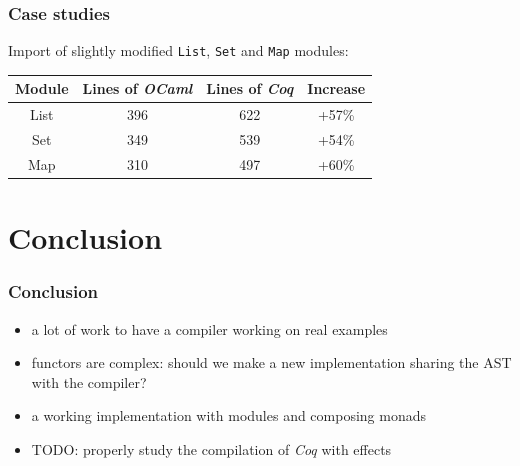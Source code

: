 \documentclass[hyperref={pdfpagelabels=false}]{beamer}
\begin{document}
  \begin{frame}
    \frametitle{Case studies}
    Import of slightly modified \texttt{List}, \texttt{Set} and \texttt{Map} modules:
    \begin{center}
      \begin{tabular}{c|cc|c}
        Module & Lines of \emph{OCaml} & Lines of \emph{Coq} & Increase\\
        \hline
        List & 396 & 622 & +57\%\\
        Set & 349 & 539 & +54\%\\
        Map & 310 & 497 & +60\%\\
      \end{tabular}
    \end{center}
  \end{frame}

  \section{Conclusion}
  \begin{frame}
    \frametitle{Conclusion}
    \begin{itemize}
      \item a lot of work to have a compiler working on real examples
      \item functors are complex: should we make a new implementation sharing the AST with the compiler?
      \item a working implementation with modules and composing monads
      \item TODO: properly study the compilation of \emph{Coq} with effects
    \end{itemize}
  \end{frame}
\end{document}
